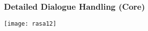 \begin{frame}[fragile]\frametitle{Detailed Dialogue Handling (Core)}


\begin{center}
\texttt{[image: rasa12]}
\end{center}


\end{frame}
